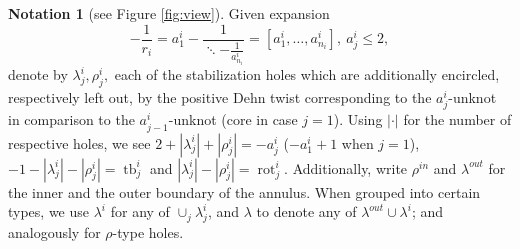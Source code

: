 \documentclass{amsart}
\theoremstyle{definition}
\newtheorem{notation}[thm]{Notation}
\begin{document}
\begin{notation}[see Figure \ref{fig:view}]
Given expansion $$-\frac{1}{r_i}=a_1^i-\frac{1}{\ddots-\frac{1}{a_{n_i}^i}}=[a_1^i,\ldots,a_{n_i}^i],\ a_j^i\leq 2,$$ denote by $\lambda_j^i, \rho_j^i,$ each of the stabilization holes which are additionally encircled, respectively left out, by the positive Dehn twist corresponding to the $a_j^i$-unknot in comparison to the $a_{j-1}^i$-unknot (core in case $j=1$). Using $|\cdot |$ for the number of respective holes, we see $2+|\lambda_j^i|+|\rho_j^i|=-a_j^i$ ($-a_1^i+1$ when $j=1$), $-1-|\lambda_j^i|-|\rho_j^i|=\operatorname{tb}_j^i$ and $|\lambda_j^i|-|\rho_j^i|=\operatorname{rot}_j^i$. Additionally, write $\rho^{in}$ and $\lambda^{out}$ for the inner and the outer boundary of the annulus. When grouped into certain types, we use $\lambda^i$ for any of $\cup_{j}\lambda_j^i$, and $\lambda$ to denote any of $\lambda^{out}\cup\lambda^i$; and analogously for $\rho$-type holes.
\end{notation}
\end{document}
